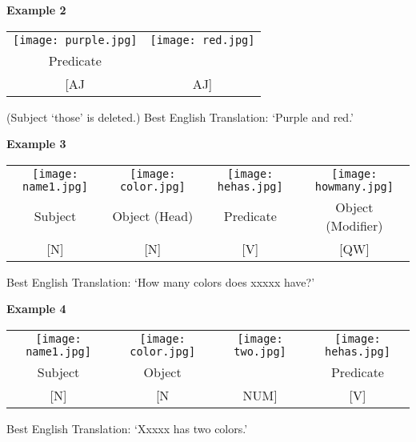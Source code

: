 \documentclass{tufte-book}
\begin{document}
\vspace{0.25cm}\noindent \textbf{Example 2}
\begin{table*}[h!]
\begin{tabular}{c  c}
\texttt{[image: purple.jpg]}&\texttt{[image: red.jpg]}\\
\footnotesize Predicate & \\
\footnotesize [AJ & \footnotesize AJ]\\
\end{tabular}
\end{table*}
\begin{fullwidth}
(Subject `those' is deleted.) Best English Translation: `Purple and red.'
\end{fullwidth}
\newpage
\noindent \textbf{Example 3}
\begin{table*}[h!]
\begin{tabular}{c |c | c | c}
\texttt{[image: name1.jpg]}&\texttt{[image: color.jpg]}&\texttt{[image: hehas.jpg]} & \texttt{[image: howmany.jpg]} \\
\footnotesize Subject & \footnotesize Object (Head) & \footnotesize Predicate &  \footnotesize Object (Modifier)\\
\footnotesize [N] & \footnotesize [N] & \footnotesize [V] &  \footnotesize [QW]\\

\end{tabular}
\end{table*}

Best English Translation: `How many colors does xxxxx have?'

\vspace{0.25cm}\noindent \textbf{Example 4}
\begin{table*}[h!]
\begin{tabular}{c |c  c | c}
\texttt{[image: name1.jpg]}&\texttt{[image: color.jpg]}&\texttt{[image: two.jpg]} & \texttt{[image: hehas.jpg]} \\
\footnotesize Subject & \footnotesize Object & & \footnotesize Predicate \\
\footnotesize [N] & \footnotesize [N & \footnotesize NUM] &  \footnotesize [V]\\

\end{tabular}
\end{table*}

Best English Translation: `Xxxxx has two colors.'
\end{document}
